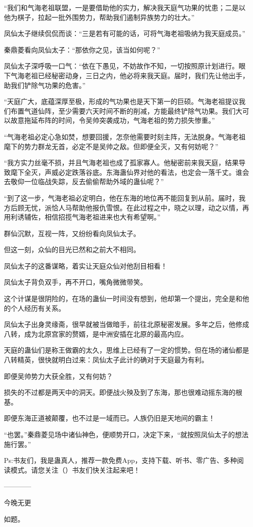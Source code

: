 \begin{this_body}
“我们和气海老祖联盟，一是要借助他的实力，解决我天庭气功果的忧患；二是以他为棋子，拉起一批外围势力，帮助我们遏制异族势力的壮大。”

凤仙太子继续侃侃而谈：“三是若有可能的话，可将气海老祖吸纳为我天庭成员。”

秦鼎菱看向凤仙太子：“那依你之见，该当如何呢？”

凤仙太子深呼吸一口气：“依在下愚见，不妨故作不知，一切按照原计划进行。眼下气海老祖已经秘密动身，三日之内，他必将来我天庭。届时，我们先让他出手，助我们铲除气功果的危害。”

“天庭广大，底蕴深厚至极，形成的气功果也是天下第一的巨硕。气海老祖提议我们布置气道仙阵，至少需要六天时间不断的削减，方能最终铲除气功果。我们大可以故意拖延布阵的时间，令吴帅突袭成功，气海老祖的势力损失惨重。”

“气海老祖必定心急如焚，想要回援，怎奈他需要时刻主阵，无法脱身。气海老祖麾下的势力群龙无首，必定不是吴帅之敌。但即便全灭，又有何妨呢？”

“我方实力丝毫不损，并且气海老祖也成了孤家寡人。他秘密前来我天庭，结果导致麾下全灭，声威必定跌落谷底。东海蛊仙界对他的看法，也定会一落千丈。谁会去敬仰一位临战失踪，反去偷偷帮助外域的蛊仙呢？”

“到了这一步，气海老祖必定明白，他在东海的地位再不能回复到从前。届时，我方后顾无忧，派恰人马帮助他报仇雪恨。在此过程之中，晓之以理，动之以情，再用利诱辅佐，相信招揽气海老祖进来也大有希望啊。”

群仙沉默，互视一阵，又纷纷看向凤仙太子。

但这一刻，众仙的目光已然和之前大不相同。

凤仙太子的这番谋略，着实让天庭众仙对他刮目相看！

凤仙太子背负双手，再不开口，嘴角微微带笑。

这个计谋是很阴险的，在场的蛊仙一时间没有想到，他却第一个提出，完全是和他的个人经历有关系。

凤仙太子出身灵缘斋，很早就被当做暗手，前往北原秘密发展。多年之后，他修成八转，成为北原宫家的赘婿，是中洲安插在北原的最高内应。

天庭的蛊仙们是称王做霸的太久，思维上已经有了一定的惯势。但在场的诸仙都是八转精英，很快就明白过来：凤仙太子此计的确对于天庭最为有利。

即便吴帅势力大获全胜，又有何妨？

损失的不过都是两天中的洞天。即便战火殃及到了东海，那也很难动摇东海的根基。

即便东海正道被颠覆，也不过是一域而已。人族仍旧是天地间的霸主！

“也罢。”秦鼎菱见场中诸仙神色，便顺势开口，决定下来，“就按照凤仙太子的想法施行罢。”

Ps:书友们，我是蛊真人，推荐一款免费App，支持下载、听书、零广告、多种阅读模式。请您关注（）书友们快关注起来吧！

------------

今晚无更

如题。

\end{this_body}

